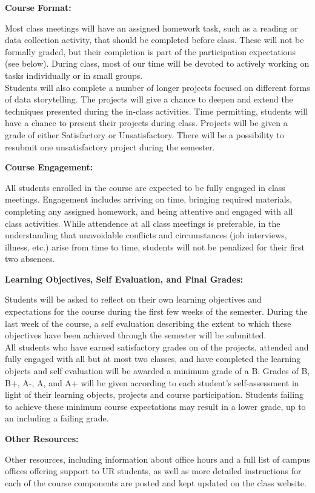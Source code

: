 \documentclass[11pt, a4paper]{article}
\begin{document}
\bigskip

\textbf{Course Format:} \vspace{6pt}

Most class meetings will have an assigned homework task, such as a
reading or data collection activity, that should be completed before class.
These will not be formally graded, but their
completion is part of the participation expectations (see below). During class,
most of our time will be devoted to actively working on tasks individually or in
small groups.\\

Students will also complete a number of longer projects focused on different
forms of data storytelling. The projects will give a chance to deepen and
extend the techniques presented during the in-class activities. Time
permitting, students will have a chance to present their projects during class.
Projects will be given a grade of either Satisfactory or Unsatisfactory.
There will be a possibility to resubmit one unsatisfactory project during the
semester.

\bigskip

\textbf{Course Engagement:} \vspace{6pt}

All students enrolled in the course are expected to be fully engaged in class
meetings. Engagement includes arriving on time, bringing required materials,
completing any assigned homework, and being attentive and engaged with all
class activities. While attendence at all class meetings is preferable, in the
understanding that unavoidable conflicts and circumstances (job interviews,
illness, etc.) arise from time to time, students will not be penalized for
their first two absences.

\bigskip

\textbf{Learning Objectives, Self Evaluation, and Final Grades:} \vspace{6pt}

Students will be asked to reflect on their own learning objectives and
expectations for the course during the first few weeks of the semester. During
the last week of the course, a self evaluation describing the extent to which
these objectives have been achieved through the semester will be submitted.\\

All students who have earned satisfactory grades on of the projects, attended
and fully engaged with all but at most two classes, and have completed the
learning objects and self evaluation will be awarded a minimum grade of a B.
Grades of B, B+, A-, A, and A+ will be given according to each student's
self-assessment in light of their learning objects, projects and course
participation. Students failing to achieve these minimum course expectations
may result in a lower grade, up to an including a failing grade.

\bigskip

\textbf{Other Resources:} \vspace{6pt}

Other resources, including information about office hours and a full list of
campus offices offering support to UR students, as well as more detailed
instructions for each of the course components are posted and kept updated on
the class website.
\end{document}
